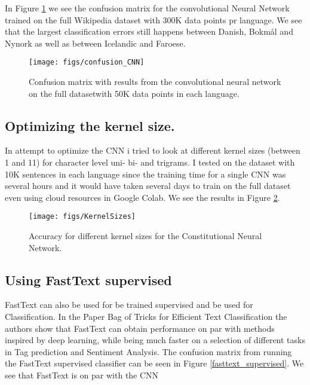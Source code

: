 In Figure \ref{confusion_matrix-big-cnn} we see the confusion matrix for the convolutional Neural Network trained on the full Wikipedia dataset with 300K data points pr language. We see that the largest classification errors still happens between Danish, Bokmål and Nynork as well as between Icelandic and Faroese. \\

\begin{figure}[h!]
  \centering
  \texttt{[image: figs/confusion\_CNN]}
  \caption{Confusion matrix with results from the convolutional neural network on the full datasetwith 50K data points in each language.}
  \label{confusion_matrix-big-cnn}
\end{figure}

\subsection{Optimizing the kernel size.}
In attempt to optimize the CNN i tried to look at different kernel sizes (between 1 and 11) for character level uni- bi- and trigrams. I tested on the dataset with 10K sentences in each language since the training time for a single CNN was several hours and it would have taken several days to train on the full dataset even using cloud resources in Google Colab. We see the results in Figure \ref{kernel_sizes}.\\

\begin{figure}[h!]
  \centering
  \texttt{[image: figs/KernelSizes]}
  \caption{Accuracy for different kernel sizes for the Constitutional Neural Network.}
  \label{kernel_sizes}
\end{figure}

\subsection{Using FastText supervised}

FastText can also be used for be trained supervised and be used for Classification. In the Paper Bag of Tricks for Efficient Text Classification \cite{BagOfTricks} the authors show that FastText can obtain performance on par with methods inspired by deep learning, while being much faster on a selection of different tasks in Tag prediction and Sentiment Analysis. The confusion matrix from running the FastText supervised classifier can be seen in Figure \ref{fasttext_supervised}. We see that FastText is on par with the CNN\\


